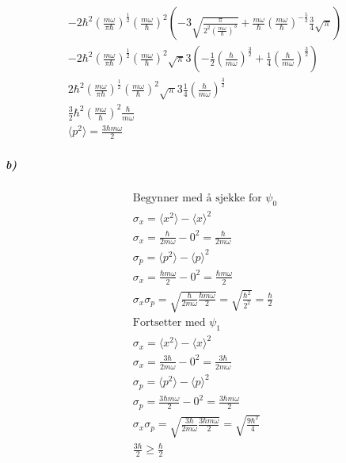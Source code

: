 \documentclass[11pt, A4paper,norsk]{article}
\begin{document}
\begin{gather*}
- 2 \hbar^2 \left( \frac{m \omega}{\pi \hbar} \right)^{\frac{1}{2}} \left( \frac{m \omega}{\hbar} \right)^{2} \left( - 3 \sqrt{\frac{\pi}{2^2 \left( \frac{m \omega}{\hbar} \right)^{3}}} + \frac{m \omega}{\hbar} \left( \frac{m \omega}{\hbar} \right)^{- \frac{5}{2}} \frac{3}{4} \sqrt{\pi} \right) \\
- 2 \hbar^2 \left( \frac{m \omega}{\pi \hbar} \right)^{\frac{1}{2}} \left( \frac{m \omega}{\hbar} \right)^{2} \sqrt{\pi} 3 \left( - \frac{1}{2} \left( \frac{\hbar}{m \omega} \right)^{\frac{3}{2}} + \frac{1}{4} \left( \frac{\hbar}{m \omega} \right)^{\frac{3}{2}} \right) \\
2 \hbar^2 \left( \frac{m \omega}{\pi \hbar} \right)^{\frac{1}{2}} \left( \frac{m \omega}{\hbar} \right)^{2} \sqrt{\pi} 3 \frac{1}{4} \left( \frac{\hbar}{m \omega} \right)^{\frac{3}{2}} \\
\frac{3}{2} \hbar^2 \left( \frac{m \omega}{\hbar} \right)^{2} \frac{\hbar}{m \omega} \\
\langle p^2 \rangle = \frac{3 \hbar m \omega}{2}
				\end{gather*}












			\subparagraph{b)}
				\begin{gather*}
\text{Begynner med å sjekke for $\psi_0$} \\
\sigma_x = \langle x^2 \rangle - \langle x \rangle^2 \\
\sigma_x = \frac{\hbar}{2 m \omega} - 0^2 = \frac{\hbar}{2 m \omega} \\
\sigma_p = \langle p^2 \rangle - \langle p \rangle^2 \\
\sigma_x = \frac{\hbar m \omega}{2} - 0^2 = \frac{\hbar m \omega}{2} \\
\sigma_x \sigma_p = \sqrt{\frac{\hbar}{2 m \omega} \frac{\hbar m \omega}{2}} = \sqrt{\frac{\hbar^2}{2^2}} = \frac{\hbar}{2} \\
\text{Fortsetter med $\psi_1$} \\
\sigma_x = \langle x^2 \rangle - \langle x \rangle^2 \\
\sigma_x = \frac{3\hbar}{2 m \omega} - 0^2 = \frac{3 \hbar}{2 m \omega} \\
\sigma_p = \langle p^2 \rangle - \langle p \rangle^2 \\
\sigma_p = \frac{3 \hbar m \omega}{2} - 0^2 = \frac{3 \hbar m \omega}{2} \\
\sigma_x \sigma_p = \sqrt{\frac{3 \hbar}{2 m \omega} \frac{3 \hbar m \omega}{2}} = \sqrt{\frac{9 \hbar^2}{4}} \\
\frac{3 \hbar}{2} \geq \frac{\hbar}{2}
				\end{gather*}
\end{document}
